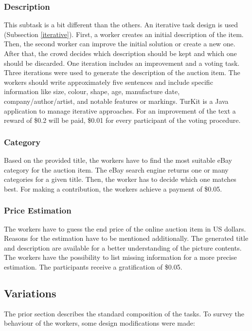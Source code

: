 \subsubsection{Description}
This subtask is a bit different than the others. An iterative task design is used (Subsection \ref{iterative}). First, a worker creates an initial description of the item. Then, the second worker can improve the initial solution or create a new one. After that, the crowd decides which description should be kept and which one should be discarded. One iteration includes an improvement and a voting task. Three iterations were used to generate the description of the auction item. The workers should write approximately five sentences and include specific information like size, colour, shape, age, manufacture date, company/author/artist, and notable features or markings. TurKit is a Java application to manage iterative approaches. For an improvement of the text a reward of \$0.2 will be paid, \$0.01 for every participant of the voting procedure.
\subsubsection{Category}
Based on the provided title, the workers have to find the most suitable eBay category for the auction item. The eBay search engine returns one or many categories for a given title. Then, the worker has to decide which one matches best. For making a contribution, the workers achieve a payment of \$0.05.
\subsubsection{Price Estimation}
The workers have to guess the end price of the online auction item in US dollars. Reasons for the estimation have to be mentioned additionally. The generated title and description are available for a better understanding of the picture contents. The workers have the possibility to list missing information for a more precise estimation. The participants receive a gratification of \$0.05.

\subsection{Variations}
The prior section describes the standard composition of the tasks. To survey the behaviour of the workers, some design modifications were made: 
